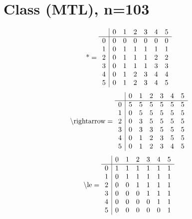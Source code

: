 \documentclass[11pt]{article}
\begin{document}
\section{Class (MTL), n=103}
\[\text{*} = 
\begin{array}{r | r r r r r r}
 & 0 & 1 & 2 & 3 & 4 & 5 \\ \hline
0 & 0 & 0 & 0 & 0 & 0 & 0 \\
1 & 0 & 1 & 1 & 1 & 1 & 1 \\
2 & 0 & 1 & 1 & 1 & 2 & 2 \\
3 & 0 & 1 & 1 & 1 & 3 & 3 \\
4 & 0 & 1 & 2 & 3 & 4 & 4 \\
5 & 0 & 1 & 2 & 3 & 4 & 5 \\
\end{array}
\]
\[\text{\textbackslash rightarrow} = 
\begin{array}{r | r r r r r r}
 & 0 & 1 & 2 & 3 & 4 & 5 \\ \hline
0 & 5 & 5 & 5 & 5 & 5 & 5 \\
1 & 0 & 5 & 5 & 5 & 5 & 5 \\
2 & 0 & 3 & 5 & 5 & 5 & 5 \\
3 & 0 & 3 & 3 & 5 & 5 & 5 \\
4 & 0 & 1 & 2 & 3 & 5 & 5 \\
5 & 0 & 1 & 2 & 3 & 4 & 5 \\
\end{array}
\]
\[\text{\textbackslash le} = 
\begin{array}{r | r r r r r r}
 & 0 & 1 & 2 & 3 & 4 & 5 \\ \hline
0 & 1 & 1 & 1 & 1 & 1 & 1 \\
1 & 0 & 1 & 1 & 1 & 1 & 1 \\
2 & 0 & 0 & 1 & 1 & 1 & 1 \\
3 & 0 & 0 & 0 & 1 & 1 & 1 \\
4 & 0 & 0 & 0 & 0 & 1 & 1 \\
5 & 0 & 0 & 0 & 0 & 0 & 1 \\
\end{array}
\]
\end{document}
